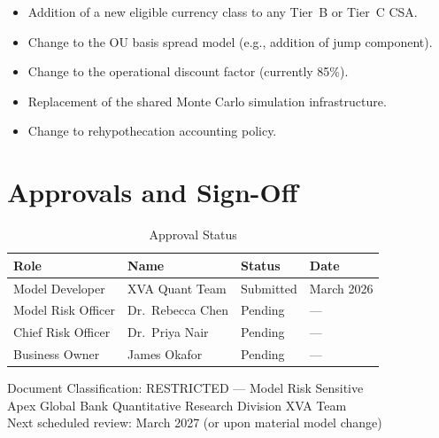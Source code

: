 \documentclass[11pt,a4paper]{article}
\begin{document}
\begin{itemize}[leftmargin=*]
  \item Addition of a new eligible currency class to any Tier~B or Tier~C CSA.
  \item Change to the OU basis spread model (e.g., addition of jump component).
  \item Change to the operational discount factor (currently 85\%).
  \item Replacement of the shared Monte Carlo simulation infrastructure.
  \item Change to rehypothecation accounting policy.
\end{itemize}

\section{Approvals and Sign-Off}

\begin{table}[h!]
\centering
\caption{Approval Status}
\begin{tabular}{@{}llll@{}}
\toprule
\textbf{Role} & \textbf{Name} & \textbf{Status} & \textbf{Date} \\
\midrule
Model Developer          & XVA Quant Team    & Submitted & March 2026 \\
Model Risk Officer       & Dr.\ Rebecca Chen & Pending   & --- \\
Chief Risk Officer       & Dr.\ Priya Nair   & Pending   & --- \\
Business Owner           & James Okafor      & Pending   & --- \\
\bottomrule
\end{tabular}
\end{table}

\vspace{1cm}
\noindent\textcolor{apexgray}{\footnotesize
Document Classification: RESTRICTED --- Model Risk Sensitive\\
Apex Global Bank \textbar{} Quantitative Research Division \textbar{} XVA Team\\
Next scheduled review: March 2027 (or upon material model change)
}
\end{document}
